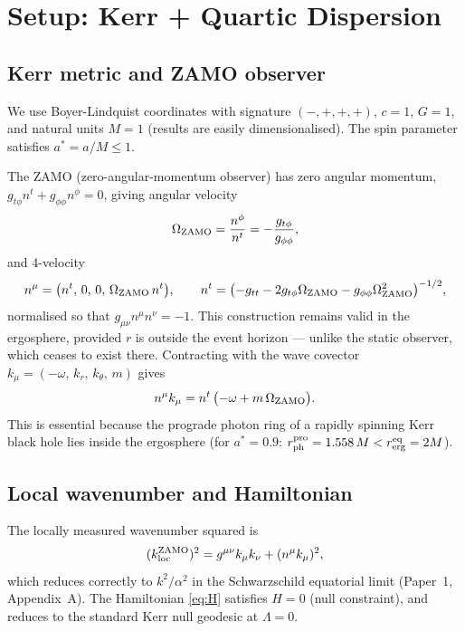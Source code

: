\documentclass[12pt,a4paper]{article}
\begin{document}
\section{Setup: Kerr + Quartic Dispersion}
\label{sec:setup}

\subsection{Kerr metric and ZAMO observer}

We use Boyer-Lindquist coordinates with signature $(-,+,+,+)$,
$c=1$, $G=1$, and natural units $M=1$ (results are easily dimensionalised).
The spin parameter satisfies $a^*=a/M\leq 1$.

The ZAMO (zero-angular-momentum observer) has zero angular momentum,
$g_{t\phi}n^t+g_{\phi\phi}n^\phi=0$, giving angular velocity
\begin{equation}
  \Omega_{\rm ZAMO} = \frac{n^\phi}{n^t} = -\frac{g_{t\phi}}{g_{\phi\phi}},
\end{equation}
and 4-velocity
\begin{equation}
  n^\mu = \bigl(n^t,\,0,\,0,\,\Omega_{\rm ZAMO}\,n^t\bigr),
  \qquad
  n^t = \bigl(-g_{tt}-2g_{t\phi}\Omega_{\rm ZAMO}
    -g_{\phi\phi}\Omega_{\rm ZAMO}^2\bigr)^{-1/2},
\end{equation}
normalised so that $g_{\mu\nu}n^\mu n^\nu=-1$. This construction
remains valid in the ergosphere, provided $r$ is outside the event
horizon --- unlike the static observer, which ceases to exist there.
Contracting with the wave covector $k_\mu=(-\omega,\,k_r,\,k_\theta,\,m)$
gives
\begin{equation}
  n^\mu k_\mu = n^t\,\bigl(-\omega + m\,\Omega_{\rm ZAMO}\bigr).
\end{equation}
This is essential because the prograde photon ring of a rapidly
spinning Kerr black hole lies inside the ergosphere
(for $a^*=0.9$: $r_{\rm ph}^{\rm pro}=1.558\,M<r_{\rm erg}^{\rm eq}=2M$).

\subsection{Local wavenumber and Hamiltonian}

The locally measured wavenumber squared is
\begin{equation}
  (k_{\rm loc}^{\rm ZAMO})^2
  = g^{\mu\nu}k_\mu k_\nu + (n^\mu k_\mu)^2,
\end{equation}
which reduces correctly to $k^2/\alpha^2$ in the Schwarzschild equatorial
limit (Paper~1, Appendix~A).
The Hamiltonian \eqref{eq:H} satisfies $H=0$ (null constraint),
and reduces to the standard Kerr null geodesic at $\Lambda=0$.
\end{document}
